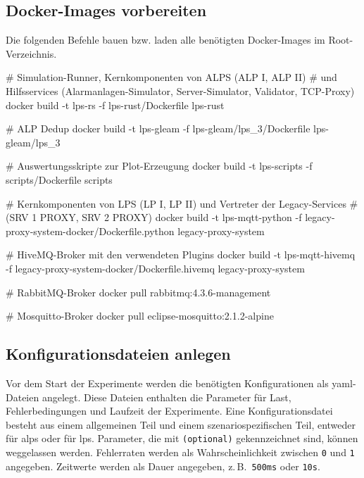 \newpage

\subsection{Docker-Images vorbereiten}

Die folgenden Befehle bauen bzw. laden alle benötigten Docker-Images im Root-Verzeichnis.

\begin{bashcode}[title={Docker-Images bauen}]
# Simulation-Runner, Kernkomponenten von ALPS (ALP I, ALP II)
# und Hilfsservices (Alarmanlagen-Simulator, Server-Simulator, Validator, TCP-Proxy)
docker build -t lps-rs -f lps-rust/Dockerfile lps-rust

# ALP Dedup
docker build -t lps-gleam -f lps-gleam/lps_3/Dockerfile lps-gleam/lps_3

# Auswertungsskripte zur Plot-Erzeugung
docker build -t lps-scripts -f scripts/Dockerfile scripts

# Kernkomponenten von LPS (LP I, LP II) und Vertreter der Legacy-Services
# (SRV 1 PROXY, SRV 2 PROXY)
docker build -t lps-mqtt-python -f legacy-proxy-system-docker/Dockerfile.python legacy-proxy-system

# HiveMQ-Broker mit den verwendeten Plugins
docker build -t lps-mqtt-hivemq -f legacy-proxy-system-docker/Dockerfile.hivemq legacy-proxy-system
\end{bashcode}


\begin{bashcode}[title={Docker-Images laden}]
# RabbitMQ-Broker
docker pull rabbitmq:4.3.6-management

# Mosquitto-Broker
docker pull eclipse-mosquitto:2.1.2-alpine
\end{bashcode}


\newpage

\subsection{Konfigurationsdateien anlegen}

Vor dem Start der Experimente werden die benötigten Konfigurationen als \gls{yaml}-Dateien angelegt. Diese Dateien enthalten die Parameter für Last, Fehlerbedingungen und Laufzeit der Experimente. Eine Konfigurationsdatei besteht aus einem allgemeinen Teil und einem szenariospezifischen Teil, entweder für \gls{alps} oder für \gls{lps}. Parameter, die mit \texttt{(optional)} gekennzeichnet sind, können weggelassen werden. Fehlerraten werden als Wahrscheinlichkeit zwischen \texttt{0} und \texttt{1} angegeben. Zeitwerte werden als Dauer angegeben, z.\,B.~\texttt{500ms} oder \texttt{10s}.

